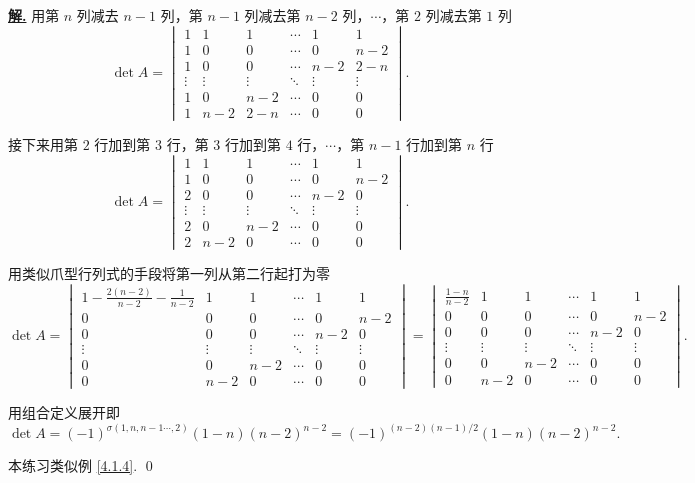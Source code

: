 \documentclass[10pt,openany]{article}
\theoremstyle{thmstyle} %
\theoremstyle{defstyle} %
\theoremstyle{prostyle} %
\theoremstyle{exastyle}
\theoremstyle{remstyle}
\newenvironment{solution}{\par\underline{\textbf{解.}} \;\fangsong}{\qed\par}
\begin{document}
\begin{solution}
	用第 \( n \) 列减去 \( n-1 \) 列，第 \( n-1 \) 列减去第 \( n-2 \) 列，\( \cdots \)，第 \( 2 \) 列减去第 \( 1 \) 列
	\[ \det A= \begin{vmatrix}
		1 & 1 & 1 &  \cdots & 1 & 1 \\
		1 & 0 & 0 &  \cdots & 0 &  n-2 \\
		1 & 0 & 0 & \cdots & n-2 & 2-n \\
		\vdots & \vdots & \vdots & \ddots  & \vdots & \vdots \\
		1 & 0 & n-2 & \cdots & 0 & 0 \\
		1 & n-2 & 2-n & \cdots & 0 & 0
	\end{vmatrix}. \]
	
	接下来用第 \( 2 \) 行加到第 \( 3 \) 行，第 \( 3 \) 行加到第 \( 4 \) 行，\( \cdots \)，第 \( n-1 \) 行加到第 \( n \) 行
	\[ \det A= \begin{vmatrix}
		1 & 1 & 1 &  \cdots & 1 & 1 \\
		1 & 0 & 0 &  \cdots & 0 &  n-2 \\
		2 & 0 & 0 & \cdots & n-2 & 0 \\
		\vdots & \vdots & \vdots & \ddots  & \vdots & \vdots \\
		2 & 0 & n-2 & \cdots & 0 & 0 \\
		2 & n-2 & 0 & \cdots & 0 & 0
	\end{vmatrix}. \]
	
	用类似爪型行列式的手段将第一列从第二行起打为零
	\[ \det A= \begin{vmatrix}
		1-\frac{2(n-2)}{n-2}-\frac{1}{n-2} & 1 & 1 &  \cdots & 1 & 1 \\[2ex]
		0 & 0 & 0 &  \cdots & 0 &  n-2 \\
		0 & 0 & 0 & \cdots & n-2 & 0 \\
		\vdots & \vdots & \vdots & \ddots  & \vdots & \vdots \\
		0 & 0 & n-2 & \cdots & 0 & 0 \\
		0 & n-2 & 0 & \cdots & 0 & 0
	\end{vmatrix}=\begin{vmatrix}
	\frac{1-n}{n-2} & 1 & 1 &  \cdots & 1 & 1 \\[2ex]
	0 & 0 & 0 &  \cdots & 0 &  n-2 \\
	0 & 0 & 0 & \cdots & n-2 & 0 \\
	\vdots & \vdots & \vdots & \ddots  & \vdots & \vdots \\
	0 & 0 & n-2 & \cdots & 0 & 0 \\
	0 & n-2 & 0 & \cdots & 0 & 0
	\end{vmatrix}. \]
	
	用组合定义展开即
	\[ \det A= (-1)^{\sigma(1,n,n-1\cdots,2)}(1-n)(n-2)^{n-2}=(-1)^{(n-2)(n-1)/2}(1-n)(n-2)^{n-2}. \]
	
	本练习类似例 \ref{4.1.4}.
\end{solution}
\end{document}
